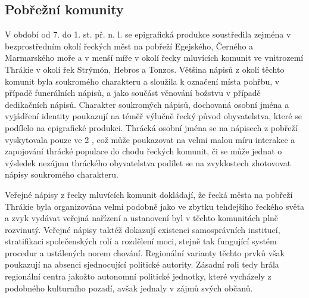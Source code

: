 
\subsection[pobřežní-komunity]{Pobřežní komunity}

V období od 7. do 1. st. př. n. l. se epigrafická produkce soustředila zejména v bezprostředním okolí řeckých měst na pobřeží Egejského, Černého a Marmarského moře a v menší míře v okolí řecky mluvících komunit ve vnitrozemí Thrákie v okolí řek Strýmón, Hebros a Tonzos. Většina nápisů z okolí těchto komunit byla soukromého charakteru a sloužila k označení místa pohřbu, v případě funerálních nápisů, a jako součást věnování božstvu v případě dedikačních nápisů. Charakter soukromých nápisů, dochovaná osobní jména a vyjádření identity poukazují na téměř výlučně řecký původ obyvatelstva, které se podílelo na epigrafické produkci. Thrácká osobní jména se na nápisech z pobřeží vyskytovala pouze ve 2 , což může poukazovat na velmi malou míru interakce a zapojování thrácké populace do chodu řeckých komunit, či se může jednat o výsledek nezájmu thráckého obyvatelstva podílet se na zvyklostech zhotovovat nápisy soukromého charakteru.

Veřejné nápisy z řecky mluvících komunit dokládají, že řecká města na pobřeží Thrákie byla organizována velmi podobně jako ve zbytku tehdejšího řeckého světa a zvyk vydávat veřejná nařízení a ustanovení byl v těchto komunitách plně rozvinutý. Veřejné nápisy taktéž dokazují existenci samosprávních institucí, stratifikaci společenských rolí a rozdělení moci, stejně tak fungující systém procedur a ustálených norem chování. Regionální varianty těchto prvků však poukazují na absenci sjednocující politické autority. Zásadní roli tedy hrála regionální centra jakožto autonomní politické jednotky, které vycházely z podobného kulturního pozadí, avšak jednaly v zájmů svých občanů.

